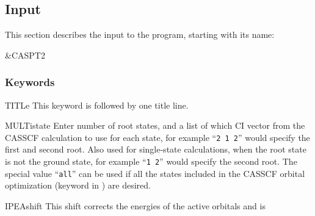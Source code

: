 \subsection{Input}
\label{UG:sec:caspt2_input}

This section describes the input to the  program, starting with its name:
\begin{inputlisting}
 &CASPT2
\end{inputlisting}

\subsubsection{Keywords}

\begin{keywordlist}
\item[TITLe]
This keyword is followed by one title line.
\item[MULTistate]
Enter number of root states, and a list of which CI vector from
the CASSCF calculation to use for each state, for example ``\verb+2 1 2+''
would specify the first and second root.
Also used for single-state calculations, when the root state is not
the ground state, for example ``\verb+1 2+'' would specify the second root.
The special value ``\verb+all+'' can be used if all the states included
in the CASSCF orbital optimization (keyword  in )
are desired.
\item[IPEAshift]
This shift corrects the energies of the active orbitals and is

\end{keywordlist}
